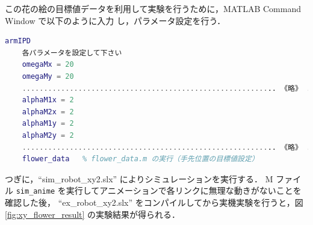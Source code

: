 この花の絵の目標値データを利用して実験を行うために，MATLAB Command Window で以下のように入力
し，パラメータ設定を行う．
\begin{lstlisting}[language=Matlab]
    armIPD
    各パラメータを設定して下さい
    omegaMx = 20
    omegaMy = 20
    ........................................................... 《略》 ...........................................................
    alphaM1x = 2
    alphaM2x = 2
    alphaM1y = 2
    alphaM2y = 2
    ........................................................... 《略》 ...........................................................
    flower_data   % flower_data.m の実行（手先位置の目標値設定）
\end{lstlisting}
つぎに，``sim\_robot\_xy2.slx'' によりシミュレーションを実行する．
M ファイル \texttt{sim\_anime} を実行してアニメーションで各リンクに無理な動きがないことを確認した後，
``ex\_robot\_xy2.slx'' をコンパイルしてから実機実験を行うと，図\ref{fig:xy_flower_result} の実験結果が得られる．

